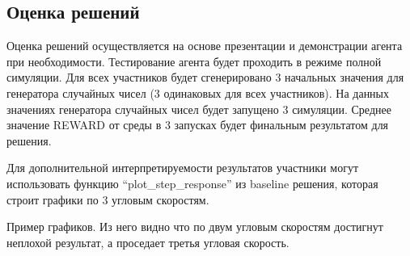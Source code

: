 \subsection*{Оценка решений}

Оценка решений осуществляется на основе презентации и демонстрации агента при необходимости. Тестирование агента будет проходить в режиме полной симуляции. Для всех участников будет сгенерировано 3 начальных значения для генератора случайных чисел (3 одинаковых для всех участников). На данных значениях генератора случайных чисел будет запущено 3 симуляции. Среднее значение REWARD от среды в 3 запусках будет финальным результатом для решения.  

Для дополнительной интерпретируемости результатов участники могут использовать функцию “plot\_step\_response” из baseline решения, которая строит графики по 3 угловым скоростям.


Пример графиков. Из него видно что по двум угловым скоростям достигнут неплохой результат, а проседает третья угловая скорость. 
